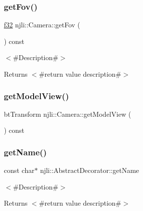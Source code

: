 \subsubsection{\texorpdfstring{get\+Fov()}{getFov()}}
{\footnotesize\ttfamily \mbox{\hyperlink{_util_8h_a5f6906312a689f27d70e9d086649d3fd}{f32}} njli\+::\+Camera\+::get\+Fov (\begin{DoxyParamCaption}{ }\end{DoxyParamCaption}) const}

$<$\#\+Description\#$>$

\begin{DoxyReturn}{Returns}
$<$\#return value description\#$>$ 
\end{DoxyReturn}
\mbox{\label{classnjli_1_1_camera_a7a6900fc5cfeca389052ba88c06564b7}} 
\subsubsection{\texorpdfstring{get\+Model\+View()}{getModelView()}}
{\footnotesize\ttfamily bt\+Transform njli\+::\+Camera\+::get\+Model\+View (\begin{DoxyParamCaption}{ }\end{DoxyParamCaption}) const\hspace{0.3cm}{\ttfamily [protected]}}

\mbox{\label{classnjli_1_1_camera_ad41266885be835f3ee602311e20877a4}} 
\subsubsection{\texorpdfstring{get\+Name()}{getName()}}
{\footnotesize\ttfamily const char$\ast$ njli\+::\+Abstract\+Decorator\+::get\+Name}

$<$\#\+Description\#$>$

\begin{DoxyReturn}{Returns}
$<$\#return value description\#$>$ 
\end{DoxyReturn}
\mbox{\label{classnjli_1_1_camera_af65d928e4008646177441036ce92903a}} 
